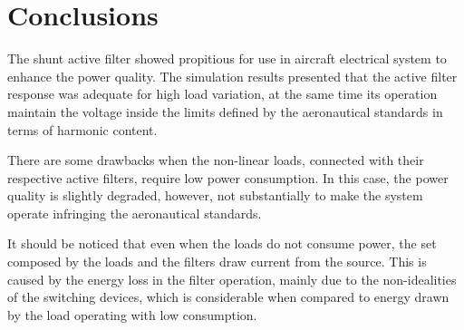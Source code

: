 \section{Conclusions}

The shunt active filter showed propitious for use in aircraft electrical system to enhance the power quality. The simulation results presented that the active filter response was adequate for high load variation, at the same time its operation maintain the voltage inside the limits defined by the aeronautical standards in terms of harmonic content.

There are some drawbacks when the non-linear loads, connected with their respective active filters, require low power consumption. In this case, the power quality is slightly degraded, however, not substantially to make the system operate infringing the aeronautical standards.

It should be noticed that even when the loads do not consume power, the set composed by the loads and the filters draw current from the source. This is caused by the energy loss in the filter operation, mainly due to the non-idealities of the switching devices, which is considerable when compared to energy drawn by the load operating with low consumption.


